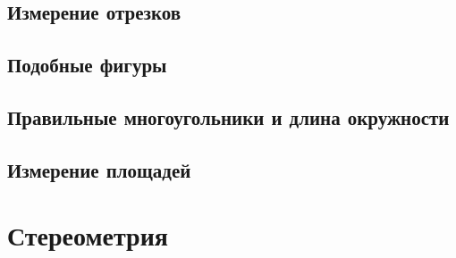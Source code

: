\documentclass[twoside]{book}
\begin{document}
\chapter{Измерение отрезков}



\chapter{Подобные фигуры}








\chapter[Правильные многоугольники]{Правильные многоугольники и длина окружности}



\chapter{Измерение площадей}




\cleardoublepage
\part{Стереометрия}




{\small
\printindex
}



\tableofcontents


\end{document}
